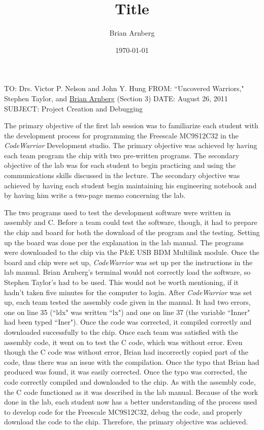 \documentclass{letter}
\title{ Title   }
\author{Brian Arnberg}
\date{\today}
\begin{document}
\label{start}
\pagestyle{empty}
\large
TO: Drs. Victor P. Nelson and John Y. Hung \newline
FROM: ``Uncovered Warriors," Stephen Taylor, and \underline{Brian Arnberg} (Section 3)\newline
DATE: August 26, 2011\newline 
SUBJECT: Project Creation and Debugging\newline

\doublespacing
The primary objective of the first lab session was to familiarize each student 
with the development process for programming the Freescale MC9S12C32 in 
the \emph{CodeWarrior} Development studio. The primary objective was achieved
by having each team program the chip with two pre-written programs.
The secondary objective of the lab was for each student to begin practicing 
and using the communications skills discussed in the lecture. 
The secondary objective was achieved by having each student begin maintaining
his engineering notebook   and by having him write a two-page memo concerning
the lab. 

The two programs used to test the development software were written in assembly and C. Before a team could test the software, though, it had to prepare the 
chip and board for both the download of the program and the testing. 
Setting up the board was done per the explanation in the lab manual. The 
programs were downloaded to the chip via the P\&E USB BDM Multilink module.
Once the board and chip were set up, \emph{CodeWarrior} was set up per the 
instructions in the lab manual. Brian Arnberg's terminal would not correctly 
load the software, so Stephen Taylor's had to be used. This would not be worth
mentioning, if it hadn't taken five minutes for the computer to login. 
After \emph{CodeWarrior} was set up, each team tested the assembly
code given in the manual. It had two errors, one on line 35 (``ldx" was written 
``lx") and one on line 37 (the variable ``Inner" had been typed ``Iner"). Once
the code was corrected, it compiled correctly and downloaded successfully to 
the chip. Once each team was satisfied with the assembly code, it went on to
test the C code, which was without error. Even though the C code was without 
error, Brian had incorrectly copied part of the code, thus there was an 
issue with the compilation. Once the typo that Brian had produced was found, it 
was easily corrected. Once the typo was corrected, the
code correctly compiled and downloaded to the chip. As with the assembly code,
the C code functioned as it was described in the lab manual. Because of the 
work done in the lab, each student now has a better understanding of the 
process used to develop code for the Freescale MC9S12C32, debug the code,
and properly download the code to the chip. Therefore, the primary objective
was achieved. 
\end{document}
